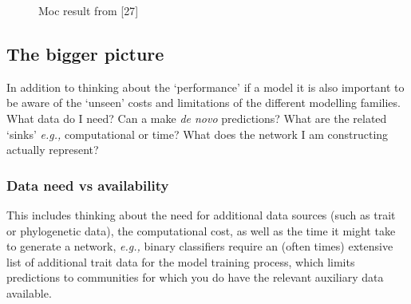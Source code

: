\documentclass[
]{article}
\begin{document}
\begin{figure}


\caption{\label{fig-pichler}Moc result from {[}27{]}}

\end{figure}%

\subsection{The bigger picture}\label{the-bigger-picture}

In addition to thinking about the `performance' if a model it is also
important to be aware of the `unseen' costs and limitations of the
different modelling families. What data do I need? Can a make \emph{de
novo} predictions? What are the related `sinks' \emph{e.g.,}
computational or time? What does the network I am constructing actually
represent?

\subsubsection{Data need vs
availability}\label{data-need-vs-availability}

This includes thinking about the need for additional data sources (such
as trait or phylogenetic data), the computational cost, as well as the
time it might take to generate a network, \emph{e.g.,} binary
classifiers require an (often times) extensive list of additional trait
data for the model training process, which limits predictions to
communities for which you do have the relevant auxiliary data available.
\end{document}
